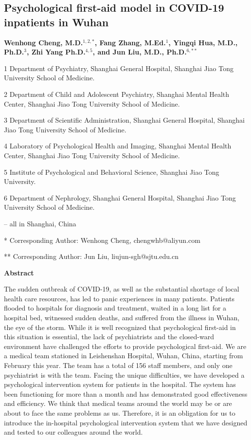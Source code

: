 \documentclass[
]{article}
\author{}
\date{}
\begin{document}
\hypertarget{header-n0}{%
\subsection{Psychological first-aid model in COVID-19 inpatients in Wuhan}\label{header-n0}}

\vspace{5mm}
\textbf{Wenhong Cheng, M.D.$^{1,2,*}$, Fang Zhang, M.Ed.$^1$, Yingqi Hua, M.D., Ph.D.$^3$, Zhi Yang Ph.D.$^{4,5}$, and Jun Liu, M.D., Ph.D.$^{6,**}$}
\vspace{5mm}

1 Department of Psychiatry, Shanghai General Hospital, Shanghai Jiao Tong University School of Medicine.

2 Department of Child and Adolescent Psychiatry, Shanghai Mental Health Center, Shanghai Jiao Tong University School of Medicine.

3 Department of Scientific Administration, Shanghai General Hospital, Shanghai Jiao Tong University School of Medicine.

4 Laboratory of Psychological Health and Imaging, Shanghai Mental Health Center, Shanghai Jiao Tong University School of Medicine. 

5 Institute of Psychological and Behavioral Science, Shanghai Jiao Tong University.

6 Department of Nephrology, Shanghai General Hospital, Shanghai Jiao Tong University School of Medicine.

-- all in Shanghai, China

* Corresponding Author: Wenhong Cheng, chengwhb@aliyun.com

** Corresponding Author: Jun Liu, liujun-sgh@sjtu.edu.cn
\vspace{5mm}

\textbf{Abstract}

The sudden outbreak of COVID-19, as well as the substantial shortage of local health care resources, has led to panic experiences in many patients. Patients flooded to hospitals for diagnosis and treatment, waited in a long list for a hospital bed, witnessed sudden deaths, and suffered from the illness in Wuhan, the eye of the storm. While it is well recognized that psychological first-aid in this situation is essential, the lack of psychiatrists and the closed-ward environment have challenged the efforts to provide psychological first-aid.  
We are a medical team stationed in Leishenshan Hospital, Wuhan, China, starting from February this year. The team has a total of 156 staff members, and only one psychiatrist is with the team. Facing the unique difficulties, we have developed a psychological intervention system for patients in the hospital. The system has been functioning for more than a month and has demonstrated good effectiveness and efficiency. 
We think that medical teams around the world may be or are about to face the same problems as us. Therefore, it is an obligation for us to introduce the in-hospital psychological intervention system that we have designed and tested to our colleagues around the world.
\end{document}
